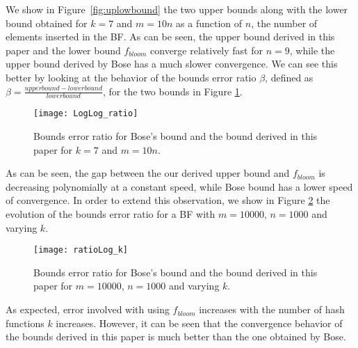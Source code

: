 We show in Figure~\ref{fig:uplowbound} the two upper bounds along with the lower bound obtained for $k=7$  and $m=10n$ as a function of $n$, the number of elements inserted in the BF. As can be seen, the upper bound derived in this paper and the lower bound $f_{bloom}$ converge relatively fast for $n=9$, while the upper bound derived by Bose has a much slower convergence. We can see this better by looking at the behavior of the bounds error ratio $\beta$, defined as $\beta=\frac{upper bound - lower bound}{lower bound}$, for the two bounds in Figure \ref{fig:ratio}.
\begin{figure}
\centering
\texttt{[image: LogLog\_ratio]}
\caption{Bounds error ratio for Bose's bound and the bound derived in this paper for $k=7$ and $m=10n$. }
\label{fig:ratio}
\end{figure}
As can be seen, the gap between the our derived upper bound and $f_{bloom}$ is decreasing polynomially at a constant speed, while Bose bound has a lower speed of convergence. In order to extend this observation, we show in Figure \ref{fig:ratiok} the evolution of the bounds error ratio for a BF with $m=10000$, $n=1000$ and varying $k$. 
\begin{figure}
\centering
\texttt{[image: ratioLog\_k]}
\caption{Bounds error ratio for Bose's bound and the bound derived in this paper for $m=10000$, $n=1000$ and varying $k$.}
\label{fig:ratiok}
\end{figure}
As expected, error involved with using $f_{bloom}$ increases with the number of hash functions $k$ increases. However, it can be seen that the convergence behavior of the bounds derived in this paper is much better than the one obtained by Bose. 



%
%


